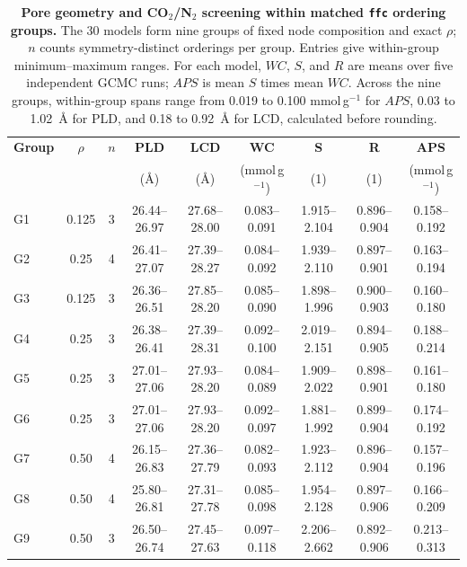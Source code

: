 \documentclass[a5paper, 10pt]{article}
\begin{document}
\begin{table}[htbp]
\centering
\scriptsize
\caption{\textbf{Pore geometry and CO$_2$/N$_2$ screening within matched \texttt{ffc} ordering groups.} The 30 models form nine groups of fixed node composition and exact $\rho$; $n$ counts symmetry-distinct orderings per group. Entries give within-group minimum--maximum ranges. For each model, $WC$, $S$, and $R$ are means over five independent GCMC runs; $APS$ is mean $S$ times mean $WC$. Across the nine groups, within-group spans range from 0.019 to 0.100 mmol\,g$^{-1}$ for $APS$, 0.03 to 1.02~\AA{} for PLD, and 0.18 to 0.92~\AA{} for LCD, calculated before rounding.}
\label{tab:ffc_co2n2_ordering}
\setlength{\tabcolsep}{0.6mm}
\renewcommand{\arraystretch}{1.12}
\begin{tabular}{@{}lcccccccc@{}}
\toprule
\textbf{Group} & \textbf{$\rho$} & \textbf{$n$} & \textbf{PLD} & \textbf{LCD} & \textbf{WC} & \textbf{S} & \textbf{R} & \textbf{APS} \\
 & & & (\AA) & (\AA) & (mmol\,g$^{-1}$) & (1) & (1) & (mmol\,g$^{-1}$) \\
\midrule
G1 & 0.125 & 3 & 26.44--26.97 & 27.68--28.00 & 0.083--0.091 & 1.915--2.104 & 0.896--0.904 & 0.158--0.192 \\
G2 & 0.25 & 4 & 26.41--27.07 & 27.39--28.27 & 0.084--0.092 & 1.939--2.110 & 0.897--0.901 & 0.163--0.194 \\
G3 & 0.125 & 3 & 26.36--26.51 & 27.85--28.20 & 0.085--0.090 & 1.898--1.996 & 0.900--0.903 & 0.160--0.180 \\
G4 & 0.25 & 3 & 26.38--26.41 & 27.39--28.31 & 0.092--0.100 & 2.019--2.151 & 0.894--0.905 & 0.188--0.214 \\
G5 & 0.25 & 3 & 27.01--27.06 & 27.93--28.20 & 0.084--0.089 & 1.909--2.022 & 0.898--0.901 & 0.161--0.180 \\
G6 & 0.25 & 3 & 27.01--27.06 & 27.93--28.20 & 0.092--0.097 & 1.881--1.992 & 0.899--0.904 & 0.174--0.192 \\
G7 & 0.50 & 4 & 26.15--26.83 & 27.36--27.79 & 0.082--0.093 & 1.923--2.112 & 0.896--0.904 & 0.157--0.196 \\
G8 & 0.50 & 4 & 25.80--26.81 & 27.31--27.78 & 0.085--0.098 & 1.954--2.128 & 0.897--0.906 & 0.166--0.209 \\
G9 & 0.50 & 3 & 26.50--26.74 & 27.45--27.63 & 0.097--0.118 & 2.206--2.662 & 0.892--0.906 & 0.213--0.313 \\
\bottomrule
\end{tabular}
\end{table}
\end{document}

